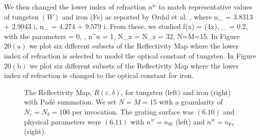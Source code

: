 \vspace{-18mm}
We then changed the lower index of refraction $n^w$ to match representative values
of tungsten $(W)$ and iron (Fe) as reported by Ordal et al. \cite{Ordal:88}, where
\bes
n_{} = 3.8313 + 2.9043 i,
\quad
n_{} = 4.274 + 9.579 i.
\ees
From these, we studied
\be
f(x) = \sin(4x),
\quad
\varepsilon_{} = 0.2,
\ee
with the parameters
\be
\alpha = 0,
\quad
{},
\quad
n^u = 1,
\quad
N_x = N_z = 32,
\quad
N=M=15.
\ee
In Figure $20(\text{a})$ we plot six different subsets of the Reflectivity
Map where the lower index of refraction is selected to model the optical constant
of tungsten. In Figure $20(\text{b})$ we plot six different subsets of 
the Reflectivity Map where the lower index of refraction is changed to the optical
constant for iron.
%
%
\vspace{-18mm}
\begin{figure}[H]
    \centering
    \vspace{3mm}
    \caption{The Reflectivity Map, $R(\varepsilon,\delta)$, for tungsten (left)
    and iron (right) with
    Pad\'e summation. We set $N=M=15$ with a granularity
    of $N_{\varepsilon}=N_{\delta}=100$ per invocation. The grating surface was $(6.10)$ and physical parameters were $(6.11)$ with $n^w = n_{W}$ (left)
    and $n^w = n_{\text{Fe}}$ (right).}
    \label{Fig:RM:Metal 2}
\end{figure}
